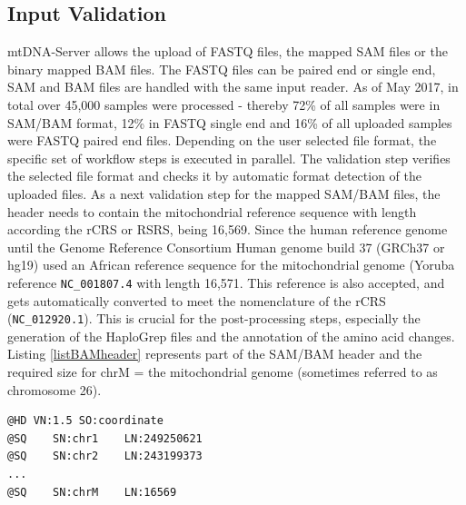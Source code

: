 \subsection{Input Validation}
mtDNA-Server allows the upload of FASTQ files, the mapped SAM files or the binary mapped BAM files. The FASTQ files can be paired end or single end, SAM and BAM files are handled with the same input reader. As of May 2017, in total over 45,000 samples were processed - thereby 72\% of all samples were in SAM/BAM format, 12\% in FASTQ single end and 16\% of all uploaded samples were FASTQ paired end files. Depending on the user selected file format, the specific set of workflow steps is executed in parallel. The validation step verifies the selected file format and checks it by automatic format detection of the uploaded files. As a next validation step for the mapped SAM/BAM files, the header needs to contain the mitochondrial reference sequence with length according the rCRS or RSRS, being 16,569. Since the human reference genome until the Genome Reference Consortium Human genome build 37 (GRCh37 or hg19) used an African reference sequence for the mitochondrial genome (Yoruba reference \texttt{NC\_001807.4} with length 16,571. This reference is also accepted, and gets automatically converted to meet the nomenclature of the rCRS (\texttt{NC\_012920.1}). This is crucial for the post-processing steps, especially the generation of the HaploGrep files and the annotation of the amino acid changes. Listing \ref{listBAMheader} represents part of the SAM/BAM header and the required size for chrM = the mitochondrial genome (sometimes referred to as chromosome 26).

\begin{lstlisting}[caption=Header of SAM/BAM file expecting length (LN) 16569 or 16571 for chrM, label=listBAMheader]
@HD VN:1.5 SO:coordinate
@SQ    SN:chr1    LN:249250621
@SQ    SN:chr2    LN:243199373
...
@SQ    SN:chrM    LN:16569
\end{lstlisting}

